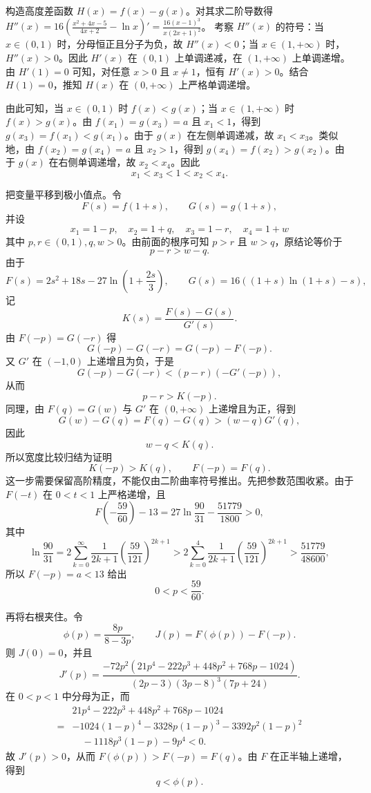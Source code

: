 \begin{solution}
构造高度差函数 $H(x) = f(x) - g(x)$。对其求二阶导数得 $H''(x) = 16\left(\frac{x^2+4x-5}{4x+2} - \ln x\right)' = \frac{16(x-1)^3}{x(2x+1)^2}$。
考察 $H''(x)$ 的符号：当 $x \in (0, 1)$ 时，分母恒正且分子为负，故 $H''(x) < 0$；当 $x \in (1, +\infty)$ 时，$H''(x) > 0$。因此 $H'(x)$ 在 $(0, 1)$ 上单调递减，在 $(1, +\infty)$ 上单调递增。由 $H'(1) = 0$ 可知，对任意 $x > 0$ 且 $x \neq 1$，恒有 $H'(x) > 0$。结合 $H(1) = 0$，推知 $H(x)$ 在 $(0, +\infty)$ 上严格单调递增。

由此可知，当 $x \in (0, 1)$ 时 $f(x) < g(x)$；当 $x \in (1, +\infty)$ 时 $f(x) > g(x)$。由 $f(x_1)=g(x_3)=a$ 且 $x_1<1$，得到 $g(x_3)=f(x_1)<g(x_1)$。由于 $g(x)$ 在左侧单调递减，故 $x_1<x_3$。类似地，由 $f(x_2)=g(x_4)=a$ 且 $x_2>1$，得到 $g(x_4)=f(x_2)>g(x_2)$。由于 $g(x)$ 在右侧单调递增，故 $x_2<x_4$。因此
\[
x_1 < x_3 < 1 < x_2 < x_4.
\]

把变量平移到极小值点。令
\[
F(s)=f(1+s),\qquad G(s)=g(1+s),
\]
并设
\[
x_1=1-p,\quad x_2=1+q,\quad x_3=1-r,\quad x_4=1+w
\]
其中 $p,r\in(0,1),q,w>0$。由前面的根序可知 $p>r$ 且 $w>q$，原结论等价于
\[
p-r>w-q.
\]
由于
\[
F(s)=2s^2+18s-27\ln\left(1+\frac{2s}{3}\right),\qquad
G(s)=16((1+s)\ln(1+s)-s),
\]
记
\[
K(s)=\frac{F(s)-G(s)}{G'(s)}.
\]
由 $F(-p)=G(-r)$ 得
\[
G(-p)-G(-r)=G(-p)-F(-p).
\]
又 $G'$ 在 $(-1,0)$ 上递增且为负，于是
\[
G(-p)-G(-r)<(p-r)(-G'(-p)),
\]
从而
\[
p-r>K(-p).
\]
同理，由 $F(q)=G(w)$ 与 $G'$ 在 $(0,+\infty)$ 上递增且为正，得到
\[
G(w)-G(q)=F(q)-G(q)>(w-q)G'(q),
\]
因此
\[
w-q<K(q).
\]
所以宽度比较归结为证明
\[
K(-p)>K(q),\qquad F(-p)=F(q).
\]
这一步需要保留高阶精度，不能仅由二阶曲率符号推出。先把参数范围收紧。由于 $F(-t)$ 在 $0<t<1$ 上严格递增，且
\[
F\left(-\frac{59}{60}\right)-13
=27\ln\frac{90}{31}-\frac{51779}{1800}>0,
\]
其中
\[
\ln\frac{90}{31}
=2\sum_{k=0}^{\infty}\frac{1}{2k+1}\left(\frac{59}{121}\right)^{2k+1}
>2\sum_{k=0}^{4}\frac{1}{2k+1}\left(\frac{59}{121}\right)^{2k+1}
>\frac{51779}{48600},
\]
所以 $F(-p)=a<13$ 给出
\[
0<p<\frac{59}{60}.
\]

再将右根夹住。令
\[
\phi(p)=\frac{8p}{8-3p},\qquad J(p)=F(\phi(p))-F(-p).
\]
则 $J(0)=0$，并且
\[
J'(p)=
\frac{-72p^2(21p^4-222p^3+448p^2+768p-1024)}
{(2p-3)(3p-8)^3(7p+24)}.
\]
在 $0<p<1$ 中分母为正，而
\[
\begin{aligned}
&21p^4-222p^3+448p^2+768p-1024\\
={}&-1024(1-p)^4-3328p(1-p)^3-3392p^2(1-p)^2\\
&\quad -1118p^3(1-p)-9p^4<0.
\end{aligned}
\]
故 $J'(p)>0$，从而 $F(\phi(p))>F(-p)=F(q)$。由 $F$ 在正半轴上递增，得到
\[
q<\phi(p).
\]


\end{solution}
